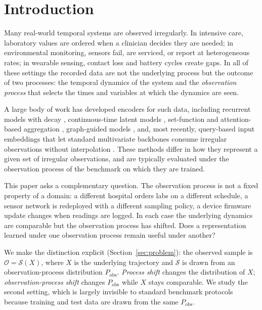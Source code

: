 \documentclass[sigconf,nonacm]{acmart}
\begin{document}
\maketitle

\section{Introduction}
Many real-world temporal systems are observed irregularly. In intensive care, laboratory values are ordered when a
clinician decides they are needed; in environmental monitoring, sensors fail, are serviced, or report at
heterogeneous rates; in wearable sensing, contact loss and battery cycles create gaps. In all of these settings
the recorded data are not the underlying process but the outcome of two processes: the temporal dynamics of the
system and the \emph{observation process} that selects the times and variables at which the dynamics are seen.

A large body of work has developed encoders for such data, including recurrent models with decay
\cite{che2018grud}, continuous-time latent models \cite{rubanova2019latentode,debrouwer2019gruodebayes,kidger2020ncde},
set-function and attention-based aggregation \cite{horn2020seft,shukla2021mtand}, graph-guided models
\cite{zhang2022raindrop,zhang2024tpatchgnn}, and, most recently, query-based input embeddings that let standard
multivariate backbones consume irregular observations without interpolation \cite{lim2026quite}. These methods
differ in how they represent a given set of irregular observations, and are typically evaluated under the
observation process of the benchmark on which they are trained.

This paper asks a complementary question. The observation process is not a fixed property of a domain: a
different hospital orders labs on a different schedule, a sensor network is redeployed with a different sampling
policy, a device firmware update changes when readings are logged. In each case the underlying dynamics are
comparable but the observation process has shifted. Does a representation learned under one observation process
remain useful under another?

We make the distinction explicit (Section~\ref{sec:problem}): the observed sample is $\mathcal O=\mathcal S(X)$,
where $X$ is the underlying trajectory and $\mathcal S$ is drawn from an observation-process distribution
$P_{\mathrm{obs}}$. \emph{Process shift} changes the distribution of $X$; \emph{observation-process shift} changes
$P_{\mathrm{obs}}$ while $X$ stays comparable. We study the second setting, which is largely invisible to standard
benchmark protocols because training and test data are drawn from the same $P_{\mathrm{obs}}$.
\end{document}
